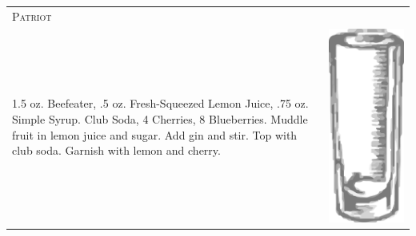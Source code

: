 \documentclass{article}
\begin{document}
\begin{tabular}{p{2in} p{0.5in}}
  \multicolumn{2}{p{3in}}{\centering\Huge\textsc{Patriot}} \\ 
   \vspace{-0.1in}1.5 oz. Beefeater, .5 oz. Fresh-Squeezed Lemon Juice, .75 oz. Simple Syrup. Club Soda, 4 Cherries, 8 Blueberries. Muddle fruit in lemon juice and sugar. Add gin and stir. Top with club soda. Garnish with lemon and cherry. &
   \vspace{-0.1in} \includegraphics{collins.png}
\end{tabular}
\end{document}
